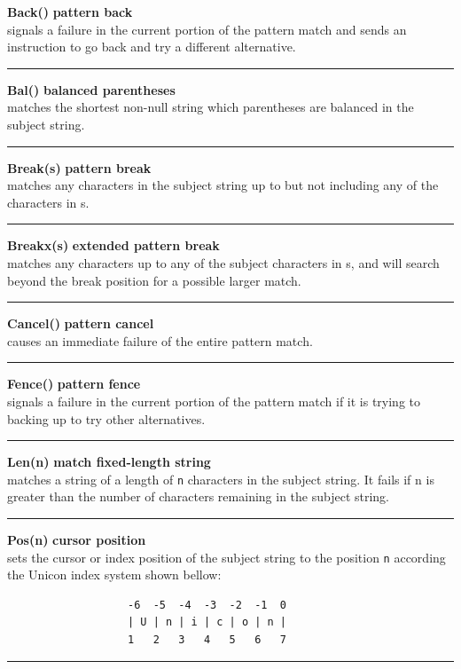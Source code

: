 \documentclass{article}
\begin{document}
\noindent\textbf{Back()} \hfill\textbf{pattern back}\\
signals a failure in the current portion of the pattern match and sends an instruction to go back and try a different alternative.\\
\noindent\rule{15cm}{0.1pt}

\noindent\textbf{Bal()} \hfill\textbf{balanced parentheses}\\
matches the shortest non-null string which parentheses are balanced in the subject string.\\
\noindent\rule{15cm}{0.1pt}

\noindent\textbf{Break(s)} \hfill\textbf{pattern break}\\
matches any characters in the subject string up to but not including any of the characters in s.\\
\noindent\rule{15cm}{0.1pt}

\noindent\textbf{Breakx(s)} \hfill\textbf{extended pattern break}\\
matches any characters up to any of the subject characters in s, and will search beyond the break position for a possible larger match.\\
\noindent\rule{15cm}{0.1pt}

\noindent\textbf{Cancel()} \hfill\textbf{pattern cancel}\\
causes an immediate failure of the entire pattern match.\\
\noindent\rule{15cm}{0.1pt}

\noindent\textbf{Fence()} \hfill\textbf{pattern fence}\\
signals a failure in the current portion of the pattern match if it is trying to backing up to try other alternatives.\\
\noindent\rule{15cm}{0.1pt}

\noindent\textbf{Len(n)} \hfill\textbf{match fixed-length string}\\
matches a string of a length of \texttt{n} characters in the subject string.  It fails if n is greater than the number of characters remaining in the subject string.\\
\noindent\rule{15cm}{0.1pt}

\noindent\textbf{Pos(n)} \hfill\textbf{cursor position}\\
sets the cursor or index position of the subject string to the position \texttt{n} according the Unicon index system shown bellow:
\begin{verbatim}
                   -6  -5  -4  -3  -2  -1  0
                   | U | n | i | c | o | n |
                   1   2   3   4   5   6   7
\end{verbatim}
\noindent\rule{15cm}{0.1pt}
\end{document}
